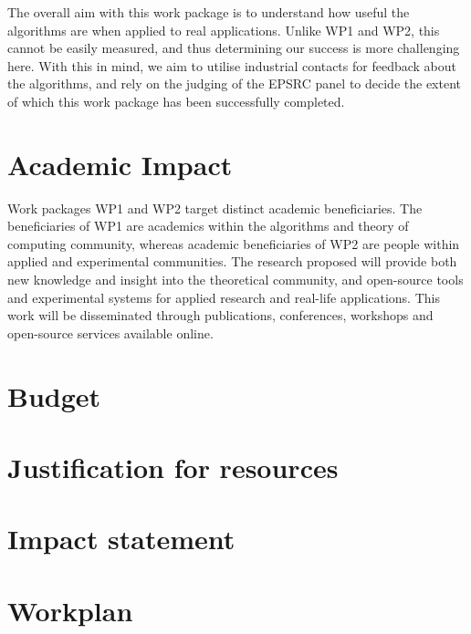 \documentclass[a4paper,11pt]{article}
\begin{document}
    The overall aim with this work package is to understand how useful the algorithms are when applied to real applications. Unlike WP1 and WP2, this cannot be easily measured, and thus determining our success is more challenging here. With this in mind, we aim to utilise industrial contacts for feedback about the algorithms, and rely on the judging of the EPSRC panel to decide the extent of which this work package has been successfully completed.

    \section{Academic Impact}

    Work packages WP1 and WP2 target distinct academic beneficiaries. The beneficiaries of WP1 are academics within the algorithms and theory of computing community, whereas academic beneficiaries of WP2 are people within applied and experimental communities. The research proposed will provide both new knowledge and insight into the theoretical community, and open-source tools and experimental systems for applied research and real-life applications. This work will be disseminated through publications, conferences, workshops and open-source services available online.

    {\footnotesize }

    \newpage
    \section{Budget}

    \newpage
    \section{Justification for resources}

    \newpage
    \section{Impact statement}

    \newpage
    \section{Workplan}
\end{document}
